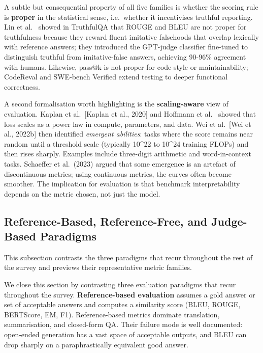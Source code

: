 \documentclass{article}
\begin{document}
A subtle but consequential property of all five families is whether the scoring rule is \textbf{proper} in the statistical sense, i.e.~whether it incentivises truthful reporting. Lin et al.~\cite{lin2022truthfulqameasurin} showed in TruthfulQA that ROUGE and BLEU are not proper for truthfulness because they reward fluent imitative falsehoods that overlap lexically with reference answers; they introduced the GPT-judge classifier fine-tuned to distinguish truthful from imitative-false answers, achieving 90-96\% agreement with humans. Likewise, pass@k is not proper for code style or maintainability; CodeReval \cite{yu20242024} and SWE-bench Verified extend testing to deeper functional correctness.

A second formalisation worth highlighting is the \textbf{scaling-aware} view of evaluation. Kaplan et al.~{[}Kaplan et al., 2020{]} and Hoffmann et al.~\cite{hoffmann20222022} showed that loss scales as a power law in compute, parameters, and data. Wei et al.~{[}Wei et al., 2022b{]} then identified \emph{emergent abilities}: tasks where the score remains near random until a threshold scale (typically 10\^{}22 to 10\^{}24 training FLOPs) and then rises sharply. Examples include three-digit arithmetic and word-in-context tasks. Schaeffer et al.~(2023) argued that some emergence is an artefact of discontinuous metrics; using continuous metrics, the curves often become smoother. The implication for evaluation is that benchmark interpretability depends on the metric chosen, not just the model.

\subsection{Reference-Based, Reference-Free, and Judge-Based Paradigms}\label{reference-based-reference-free-and-judge-based-paradigms}

This subsection contrasts the three paradigms that recur throughout the rest of the survey and previews their representative metric families.

We close this section by contrasting three evaluation paradigms that recur throughout the survey. \textbf{Reference-based evaluation} assumes a gold answer or set of acceptable answers and computes a similarity score (BLEU, ROUGE, BERTScore, EM, F1). Reference-based metrics dominate translation, summarisation, and closed-form QA. Their failure mode is well documented: open-ended generation has a vast space of acceptable outputs, and BLEU can drop sharply on a paraphrastically equivalent good answer.
\end{document}
